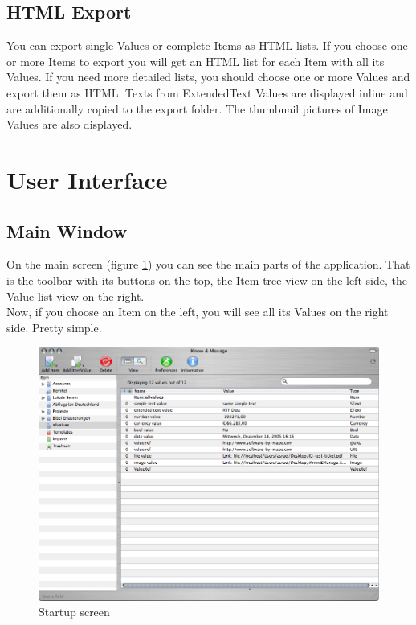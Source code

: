 \documentclass[12pt,a4]{article}
\begin{document}
\subsection{HTML Export}
\label{html_export}
\medskip
You can export single Values or complete Items as HTML lists. If you choose one or more Items to export you will get an HTML list for each Item with all its Values. If you need more detailed lists, you should choose one or more Values and export them as HTML. Texts from ExtendedText Values are displayed inline and are additionally copied to the export folder. The thumbnail pictures of Image Values are also displayed.
\newpage
\section{User Interface}
\label{gui}
\medskip
\subsection{Main Window}
\label{gui_mainwindow}
\medskip
On the main screen (figure \ref{image:startup}) you can see the main parts of the application. That is the toolbar with its buttons on the top, the Item tree view on the left side, the Value list view on the right. \\
Now, if you choose an Item on the left, you will see all its Values on the right side. Pretty simple.
% 
\begin{figure}[ht]
\includegraphics[width=13.5cm]{images/MainWindow.png}
\caption{Startup screen}
\label{image:startup}
\end{figure}
\noindent
\end{document}
